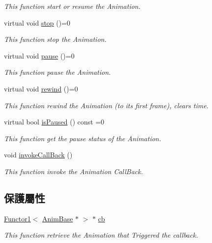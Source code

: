 \begin{DoxyCompactItemize}
\begin{DoxyCompactList}\small\item\em This function start or resume the Animation. \end{DoxyCompactList}\item 
virtual void \hyperlink{class_i_dream_sky_1_1_anim_base_ab14e27f6d184beaa70fb4fd397bdd2c6}{stop} ()=0
\begin{DoxyCompactList}\small\item\em This function stop the Animation. \end{DoxyCompactList}\item 
virtual void \hyperlink{class_i_dream_sky_1_1_anim_base_a58fa49c138e02d13ac9449644a79de03}{pause} ()=0
\begin{DoxyCompactList}\small\item\em This function pause the Animation. \end{DoxyCompactList}\item 
virtual void \hyperlink{class_i_dream_sky_1_1_anim_base_af22d4309bea55559e89f8ee6e065e152}{rewind} ()=0
\begin{DoxyCompactList}\small\item\em This function rewind the Animation (to its first frame), clears time. \end{DoxyCompactList}\item 
virtual bool \hyperlink{class_i_dream_sky_1_1_anim_base_a8aee0c5d07fdaafd564eac6dd086a097}{is\+Paused} () const  =0
\begin{DoxyCompactList}\small\item\em This function get the pause status of the Animation. \end{DoxyCompactList}\item 
void \hyperlink{class_i_dream_sky_1_1_anim_base_a179fb12b7a4cca8f6eb47ca1ebe95fab}{invoke\+Call\+Back} ()
\begin{DoxyCompactList}\small\item\em This function invoke the Animation Call\+Back. \end{DoxyCompactList}\end{DoxyCompactItemize}
\subsection*{保護屬性}
\begin{DoxyCompactItemize}
\item 
\hyperlink{class_i_dream_sky_1_1_functor1}{Functor1}$<$ \hyperlink{class_i_dream_sky_1_1_anim_base}{Anim\+Base} $\ast$ $>$ $\ast$ \hyperlink{class_i_dream_sky_1_1_anim_base_aa9e238fe3d737051eae0a18084bbc057}{cb}
\begin{DoxyCompactList}\small\item\em This function retrieve the Animation that Triggered the callback. \end{DoxyCompactList}\end{DoxyCompactItemize}


